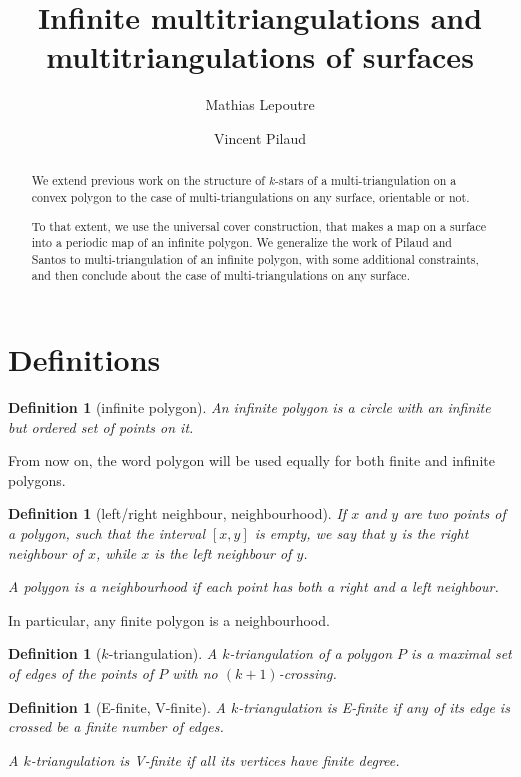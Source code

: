 \documentclass{amsart}
\title{Infinite multitriangulations and multitriangulations of surfaces}
\author{Mathias Lepoutre}
\author{Vincent Pilaud}
\newtheorem{definition}[theorem]{Definition}
\theoremstyle{remark}
\newcommand{\darkblue}{\color{darkblue}} %
\newcommand{\defn}[1]{\textsl{\darkblue #1}} %
\newcommand*{\nbd}[0]{neighbourhood\xspace}
\newcommand*{\ef}[0]{E-finite\xspace}
\newcommand*{\vf}[0]{V-finite\xspace}
\newcommand*{\ktg}[0]{$k$-triangulation\xspace}
\begin{document}
\begin{abstract}
We extend previous work on the structure of $k$-stars of a multi-triangulation on a convex polygon to the case of multi-triangulations on any surface, orientable or not. 

To that extent, we use the universal cover construction, that makes a map on a surface into a periodic map of an infinite polygon. We generalize the work of Pilaud and Santos to multi-triangulation of an infinite polygon, with some additional constraints, and then conclude about the case of multi-triangulations on any surface.
\end{abstract}

\maketitle

\section{Definitions}


\begin{definition}[infinite polygon]
An \defn{infinite polygon} is a circle with an infinite but ordered set of points on it.
\end{definition}

From now on, the word polygon will be used equally for both finite and infinite polygons.

\begin{definition}[left/right neighbour, \nbd]
If $x$ and $y$ are two points of a polygon, such that the interval $[x,y]$ is empty, we say that $y$ is the \defn{right neighbour} of $x$, while $x$ is the \defn{left neighbour} of $y$.

A polygon is a \nbd if each point has both a right and a left neighbour.
\end{definition}

In particular, any finite polygon is a \nbd.

\begin{definition}[\ktg]
A \defn{\ktg} of a polygon $P$ is a maximal set of edges of the points of $P$ with no $(k+1)$-crossing.
\end{definition}

\begin{definition}[\ef, \vf]
A \ktg is \defn{\ef} if any of its edge is crossed be a finite number of edges.

A \ktg is \defn{\vf} if all its vertices have finite degree.
\end{definition}
\end{document}
